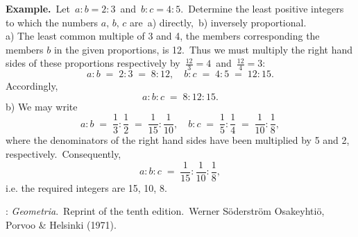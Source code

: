 \documentclass[12pt]{article}
\theoremstyle{definition}
\begin{document}
\textbf{Example.}\, Let\, $a\!:\!b = 2\!:\!3$\, and\, $b\!:\!c = 4\!:\!5$.\, Determine the least positive integers to which the numbers $a,\,b,\,c$ are\, a) directly,\, b) inversely proportional.\\
a) The least common multiple of 3 and 4, the members corresponding the members $b$ in the given proportions, is 12.\, Thus we must multiply the right hand sides of these proportions respectively by\, $\frac{12}{3} = 4$\, and\, $\frac{12}{4} = 3$:
$$a\!:\!b \;=\; 2\!:\!3 \;=\; 8\!:\!12, \quad b\!:\!c \;=\; 4\!:\!5 \;=\; 12\!:\!15.$$
Accordingly,
$$a\!:\!b\!:\!c \;=\; 8\!:\!12\!:\!15.$$
b) We may write
$$a\!:\!b \;=\; \frac{1}{3}\!:\!\frac{1}{2} \;=\; \frac{1}{15}\!:\!\frac{1}{10}, \quad 
  b\!:\!c \;=\; \frac{1}{5}\!:\!\frac{1}{4} \;=\; \frac{1}{10}\!:\!\frac{1}{8},$$
where the denominators of the right hand sides have been multiplied by 5 and 2, respectively.\, Consequently,
$$a\!:\!b\!:\!c \;=\; \frac{1}{15}\!:\!\frac{1}{10}\!:\!\frac{1}{8},$$
i.e. the required integers are 15, 10, 8.


\begin{thebibliography}{8}
: {\em Geometria}.\, Reprint of the tenth edition.\, Werner S\"oderstr\"om Osakeyhti\"o, Porvoo \& Helsinki (1971).
\end{thebibliography}

\end{document}
